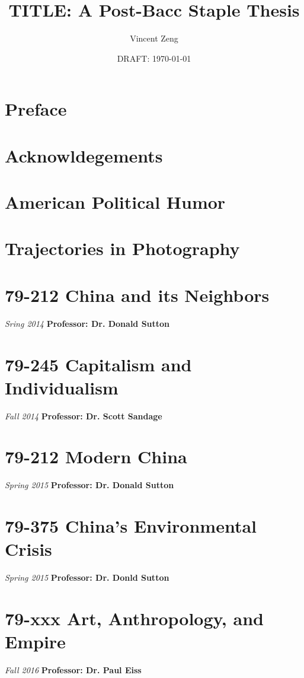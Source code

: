 \documentclass{book}[10pt,letterpaper,openany]
\begin{document}
\title{TITLE: A Post-Bacc Staple Thesis}
\author{Vincent Zeng}
\date{DRAFT: \today}

\frontmatter

\maketitle
\tableofcontents

\chapter{Preface}


\chapter{Acknowldegements}



\mainmatter

\chapter{American Political Humor}


\chapter{Trajectories in Photography}


\chapter{79-212 China and its Neighbors}
\textit{Sring 2014}
\textbf{Professor: Dr. Donald Sutton}

\chapter{79-245 Capitalism and Individualism}
\textit{Fall 2014}
\textbf{Professor: Dr. Scott Sandage}

\chapter{79-212 Modern China}
\textit{Spring 2015}
\textbf{Professor: Dr. Donald Sutton}

\chapter{79-375 China's Environmental Crisis}
\textit{Spring 2015}
\textbf{Professor: Dr. Donld Sutton}

\chapter{79-xxx Art, Anthropology, and Empire}
\textit{Fall 2016}
\textbf{Professor: Dr. Paul Eiss}
\end{document}
